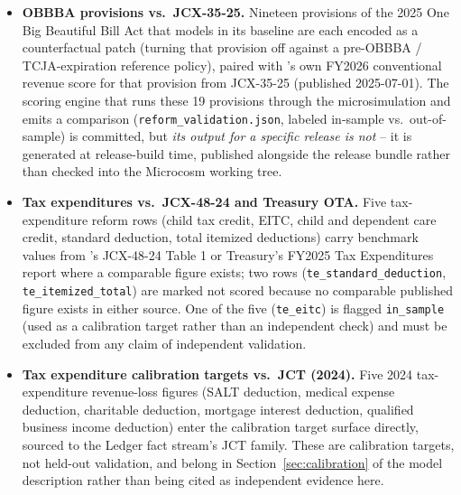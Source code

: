 \begin{itemize}
\item \textbf{OBBBA provisions vs.\ JCX-35-25.} Nineteen provisions of the
2025 One Big Beautiful Bill Act that \policyengineus{} models in its
baseline are each encoded as a counterfactual patch (turning that provision
off against a pre-OBBBA / TCJA-expiration reference policy), paired with
\jct{}'s own FY2026 conventional revenue score for that provision from
JCX-35-25 (published 2025-07-01).
The scoring engine that runs these 19 provisions through the
\policyengineus{} microsimulation and emits a comparison
(\texttt{reform\_validation.json}, labeled in-sample vs.\ out-of-sample) is
committed, but \emph{its output for a specific release is not} -- it is
generated at release-build time, published alongside the release bundle
rather than checked into the Microcosm working tree.
\item \textbf{Tax expenditures vs.\ JCX-48-24 and Treasury OTA.} Five
tax-expenditure reform rows (child tax credit, EITC, child and dependent
care credit, standard deduction, total itemized deductions) carry benchmark
values from \jct{}'s JCX-48-24 Table 1 or Treasury's FY2025 Tax
Expenditures report where a comparable figure exists; two rows
(\texttt{te\_standard\_deduction}, \texttt{te\_itemized\_total}) are marked
not scored because no comparable published figure exists in either source.
One of the five (\texttt{te\_eitc}) is flagged \texttt{in\_sample} (used as
a calibration target rather than an independent check) and must be excluded
from any claim of independent validation.
\item \textbf{Tax expenditure calibration targets vs.\ JCT (2024).} Five
2024 tax-expenditure revenue-loss figures (SALT deduction, medical expense
deduction, charitable deduction, mortgage interest deduction, qualified
business income deduction) enter the calibration target surface directly,
sourced to the Ledger fact stream's JCT family.
 These are
calibration targets, not held-out validation, and belong in
Section~\ref{sec:calibration} of the model description rather than being
cited as independent evidence here.
\end{itemize}

